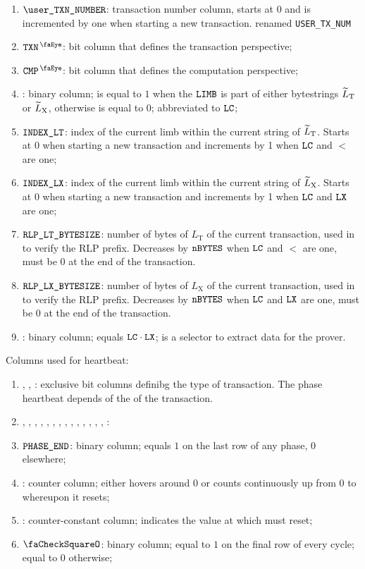 \begin{enumerate}
    \item $\userTransactionNumber$:
	transaction number column, starts at 0 and is incremented by one when starting a new transaction. \specTodo{} renamed \texttt{USER\_TX\_NUM}
    \item $\isTxn$:
	bit column that defines the transaction perspective;
	\item $\isCmp$:
	bit column that defines the computation perspective;
	\item {}:
    binary column;
    is equal to $1$ when the $\texttt{LIMB}$ is part of either \rlp{} bytestrings $\widetilde{L}_{\mathrm{T}}$ or $\widetilde{L}_{\mathrm{X}}$, otherwise is equal to $0$;
    abbreviated to $\texttt{LC}$;
    \item $\texttt{INDEX\_LT}$:
    index of the current limb within the current string of $\widetilde{L}_{\mathrm{T}}$. Starts at 0 when starting a new transaction and increments by 1 when $\texttt{LC}$ and $\lt$ are one; 
    \item $\texttt{INDEX\_LX}$:                                                       
    index of the current limb within the current string of $\widetilde{L}_{\mathrm{X}}$. Starts at 0 when starting a new transaction and increments by 1 when $\texttt{LC}$ and $\texttt{LX}$ are one;
    \item $\texttt{RLP\_LT\_BYTESIZE}$:
    number of bytes of $L_{\mathrm{T}}$ of the current transaction, used in \phaseRlpPrefix{} to verify the RLP prefix. Decreases by $\texttt{nBYTES}$ when $\texttt{LC}$ and $\lt$ are one, must be 0 at the end of the transaction.
    \item $\texttt{RLP\_LX\_BYTESIZE}$:
    number of bytes of $L_{\mathrm{X}}$ of the current transaction, used in \phaseRlpPrefix{} to verify the RLP prefix. Decreases by $\texttt{nBYTES}$ when $\texttt{LC}$ and $\texttt{LX}$ are one, must be 0 at the end of the transaction.
    \item \toHashByProver{}:
    binary column; equals $\texttt{LC} \cdot \texttt{LX}$; is a selector to extract data for the prover.
\end{enumerate}
Columns used for heartbeat:
\begin{enumerate}[resume]
    \item \typeZeroTx{}, \typeOneTx{}, \typeTwoTx{}:
    exclusive bit columns definibg the type of transaction. The phase heartbeat depends of the \transactionType{} of the transaction.
    \item \phaseRlpPrefix{}, \phaseChainId{}, \phaseNonce{}, \phaseGasPrice{}, \phaseMaxPriorityFeePerGas{}, \phaseMaxFeePerGas{}, \phaseGasLimit{}, \phaseTo{}, \phaseValue{}, \phaseData{}, \phaseAccessList{}, \phaseBeta{}, \phaseY{}, \phaseR{}, \phaseS{}:
    \item $\texttt{PHASE\_END}$:
    binary column; equals $1$ on the last row of any phase, $0$ elsewhere;
    \item \ct{}:
	counter column; 
	either hovers around $0$ or counts continuously up from $0$ to \maxCt{} whereupon it resets;
    \item \maxCt:
	counter-constant column;
	indicates the value at which \ct{} must reset;
	\item $\done$:
    binary column; equal to $1$ on the final row of every \ct{} cycle; equal to $0$ otherwise;
\end{enumerate}
